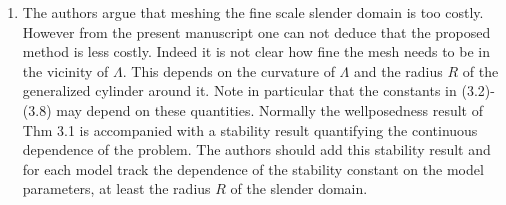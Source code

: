 \documentclass{article}
\begin{document}
\begin{enumerate}
\item The authors argue that meshing the fine scale slender domain is
  too costly. However from the present manuscript one can not deduce
  that the proposed method is less costly. Indeed it is not clear how
  fine the mesh needs to be in the vicinity of $\Lambda$. This depends
  on the curvature of $\Lambda$ and the radius $R$ of the generalized
  cylinder around it.
Note in particular that the constants in (3.2)-(3.8) may depend on
these quantities. Normally the wellposedness result of Thm 3.1 is
accompanied with a stability result quantifying the continuous
dependence of the problem. The authors should add this stability
result and for each model track the dependence of the stability
constant on the model parameters, at least the radius $R$ of the
slender domain.


\end{enumerate}
\end{document}
